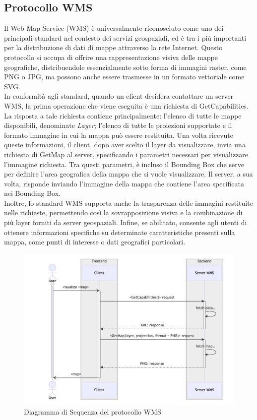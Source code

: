 \subsection{Protocollo WMS}

Il Web Map Service (WMS) è universalmente riconosciuto come uno dei principali standard nel contesto dei servizi geospaziali, ed è tra i più importanti per la distribuzione di dati di mappe attraverso la rete Internet.
Questo protocollo si occupa di offrire una rappresentazione visiva delle mappe geografiche, distribuendole essenzialmente sotto forma di immagini raster, come PNG o JPG, ma possono anche essere trasmesse in un formato vettoriale come SVG.
\\In conformità agli standard, quando un client desidera contattare un server WMS, la prima operazione che viene eseguita è una richiesta di GetCapabilities. La risposta a tale richiesta contiene principalmente: l'elenco di tutte le mappe disponibili, denominate \textit{Layer}; l'elenco di tutte le proiezioni supportate e il formato immagine in cui la mappa può essere restituita. Una volta ricevute queste informazioni, il client, dopo aver scelto il layer da visualizzare, invia una richiesta di GetMap al server, specificando i parametri necessari per visualizzare l'immagine richiesta. Tra questi parametri, è incluso il Bounding Box che serve per definire l'area geografica della mappa che si vuole visualizzare. Il server, a sua volta, risponde inviando l'immagine della mappa che contiene l'area specificata nei Bounding Box.
\\Inoltre, lo standard WMS supporta anche la trasparenza delle immagini restituite nelle richieste, permettendo così la sovrapposizione visiva e la combinazione di più layer forniti da server geospaziali. Infine, se abilitato, consente agli utenti di ottenere informazioni specifiche su determinate caratteristiche presenti sulla mappa, come punti di interesse o dati geografici particolari.
\begin{figure}[htbp]
      \centering
      \includegraphics[width=1\textwidth]{images/Capitolo2/ProtocolWMS.jpg}
      \caption{Diagramma di Sequenza del protocollo WMS}
      \label{fig:wms protocol}
\end{figure}

